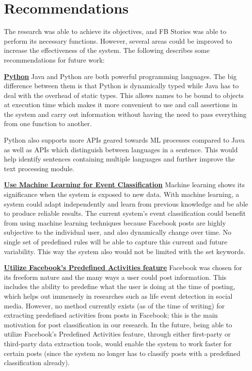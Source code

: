 \section{Recommendations}
The research was able to achieve its objectives, and FB Stories was able to perform its necessary functions. However, several areas could be improved to increase the effectiveness of the system. The following describes some recommendations for future work:

\underline{\textbf{Python}} \newline
Java and Python are both powerful programming languages. The big difference between them is that Python is dynamically typed while Java has to deal with the overhead of static types. This allows names to be bound to objects at execution time which makes it more convenient to use and call assertions in the system and carry out information without having the need to pass everything from one function to another. 

Python also supports more APIs geared towards ML processes compared to Java as well as APIs which distinguish between languages in a sentence. This would help identify sentences containing multiple languages and further improve the text processing module.

\underline{\textbf{Use Machine Learning for Event Classification}} \newline
Machine learning shows its significance when the system is exposed to new data. With machine learning, a system could adapt independently and learn from previous knowledge and be able to produce reliable results. The current system's event classification could benefit from using machine learning techniques because Facebook posts are highly subjective to the individual user, and also dynamically change over time. No single set of predefined rules will be able to capture this current and future variability. This way the system also would not be limited with the set keywords.

\underline{\textbf{Utilize Facebook's Predefined Activities feature}} \newline
Facebook was chosen for its freeform nature and the many ways a user could post information. This includes the ability to predefine what the user is doing at the time of posting, which helps out immensely in researches such as life event detection in social media. However, no method currently exists (as of the time of writing) for extracting predefined activities from posts in Facebook; this is the main motivation for post classification in our research. In the future, being able to utilize Facebook's Predefined Activities feature, through either first-party or third-party data extraction tools, would enable the system to work faster for certain posts (since the system no longer has to classify posts with a predefined classification already). 

